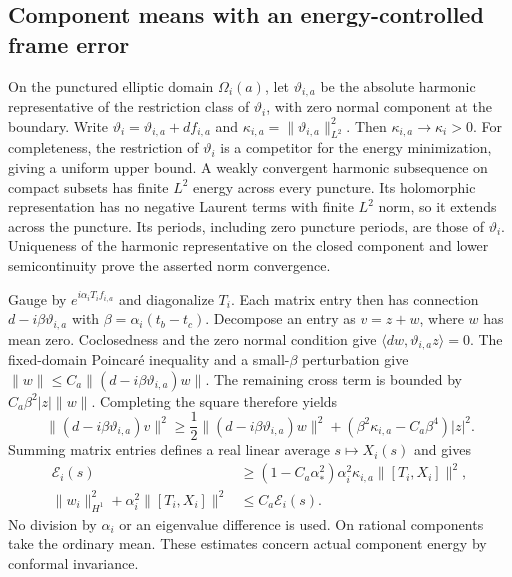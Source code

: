 \subsection{Component means with an energy-controlled frame error}
On the punctured elliptic domain $\Omega_i(a)$, let
$\vartheta_{i,a}$ be the absolute harmonic representative of
the restriction class of $\vartheta_i$, with zero normal
component at the boundary. Write
$\vartheta_i=\vartheta_{i,a}+df_{i,a}$ and
$\kappa_{i,a}=\|\vartheta_{i,a}\|_{L^2}^2$.
Then $\kappa_{i,a}\to\kappa_i>0$. For completeness, the
restriction of $\vartheta_i$ is a competitor for the energy
minimization, giving a uniform upper bound. A weakly
convergent harmonic subsequence on compact subsets has finite
$L^2$ energy across every puncture. Its holomorphic
representation has no negative Laurent terms with finite
$L^2$ norm, so it extends across the puncture. Its periods,
including zero puncture periods, are those of
$\vartheta_i$. Uniqueness of the harmonic representative
on the closed component and lower semicontinuity prove
the asserted norm convergence.

Gauge by $e^{i\alpha_iT_if_{i,a}}$ and diagonalize $T_i$.
Each matrix entry then has connection
$d-i\beta\vartheta_{i,a}$ with
$\beta=\alpha_i(t_b-t_c)$. Decompose an entry as $v=z+w$,
where $w$ has mean zero. Coclosedness and the zero normal
condition give
$\langle dw,\vartheta_{i,a}z\rangle=0$.
The fixed-domain Poincar\'e inequality and a small-$\beta$
perturbation give
$\|w\|\le C_a\|(d-i\beta\vartheta_{i,a})w\|$.
The remaining cross term is bounded by
$C_a\beta^2|z|\|w\|$. Completing the square therefore yields
\begin{equation}\label{eq:component-lower-entry}
 \|(d-i\beta\vartheta_{i,a})v\|^2
 \ge\frac12\|(d-i\beta\vartheta_{i,a})w\|^2
            +(\beta^2\kappa_{i,a}-C_a\beta^4)|z|^2.
\end{equation}
Summing matrix entries defines a real linear average
$s\mapsto X_i(s)$ and gives
\begin{equation}\label{eq:component-lower}
 \begin{split}
 \mathcal E_i(s)&\ge
   (1-C_a\alpha_*^2)\alpha_i^2\kappa_{i,a}
                                  \|[T_i,X_i]\|^2,\\
 \|w_i\|_{H^1}^2+\alpha_i^2\|[T_i,X_i]\|^2
                                      &\le C_a\mathcal E_i(s).
 \end{split}
\end{equation}
No division by $\alpha_i$ or an eigenvalue difference is used.
On rational components take the ordinary mean. These estimates
concern actual component energy by conformal invariance.

